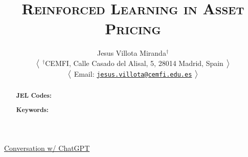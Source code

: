 \documentclass[12pt,a4paper]{article}
\title{\textsc{
{\LARGE Reinforced Learning in Asset Pricing}
}}
\author[1]{
{ \bx \bx \bx Jesus Villota Miranda$^{\dagger}$
}

\bx 
{\small
$\big{<}$
\noindent $^{\dagger}$CEMFI, Calle Casado del Alisal, 5, 28014 Madrid, Spain 
$\big{>}$

$\big{<}$
Email: \href{jesus.villota@cemfi.edu.es}{\texttt{jesus.villota@cemfi.edu.es}}
$\big{>}$
}
}
\date{}  %
\begin{document}
\maketitle
\thispagestyle{empty}  %


\begin{abstract}
%

\bigskip
\noindent\textbf{JEL Codes:} 

\noindent\textbf{Keywords:}
\end{abstract}


\newpage
\tableofcontents
\thispagestyle{empty}  %


\newpage
\setcounter{page}{1}

%
%
%


\noindent \Vhrulefill 

{\centering \href{https://chatgpt.com/c/66f3b1d1-9448-800d-8d38-85f812d77b9e}{Conversation w/ ChatGPT} \par}

\noindent \Vhrulefill


%


%


%
%
%


%
%
%
\end{document}
